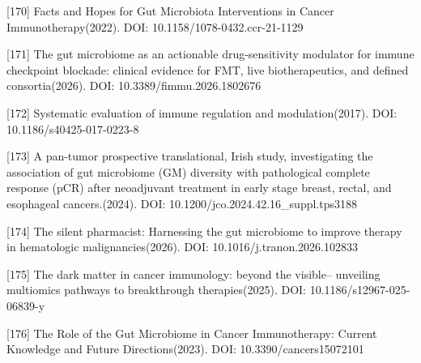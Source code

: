 \documentclass[11pt]{article}
\begin{document}
{[}170{]} Facts and Hopes for Gut Microbiota Interventions in Cancer Immunotherapy(2022). DOI: 10.1158/1078-0432.ccr-21-1129

{[}171{]} The gut microbiome as an actionable drug-sensitivity modulator for immune checkpoint blockade: clinical evidence for FMT, live biotherapeutics, and defined consortia(2026). DOI: 10.3389/fimmu.2026.1802676

{[}172{]} Systematic evaluation of immune regulation and modulation(2017). DOI: 10.1186/s40425-017-0223-8

{[}173{]} A pan-tumor prospective translational, Irish study, investigating the association of gut microbiome (GM) diversity with pathological complete response (pCR) after neoadjuvant treatment in early stage breast, rectal, and esophageal cancers.(2024). DOI: 10.1200/jco.2024.42.16\_suppl.tps3188

{[}174{]} The silent pharmacist: Harnessing the gut microbiome to improve therapy in hematologic malignancies(2026). DOI: 10.1016/j.tranon.2026.102833

{[}175{]} The dark matter in cancer immunology: beyond the visible-- unveiling multiomics pathways to breakthrough therapies(2025). DOI: 10.1186/s12967-025-06839-y

{[}176{]} The Role of the Gut Microbiome in Cancer Immunotherapy: Current Knowledge and Future Directions(2023). DOI: 10.3390/cancers15072101
\end{document}

